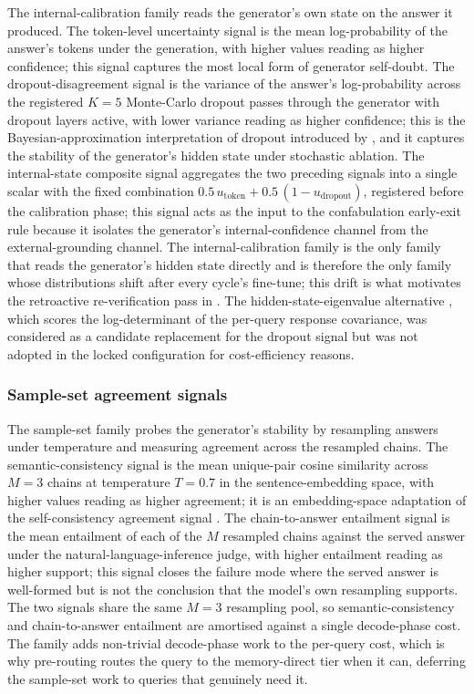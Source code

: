 The internal-calibration family reads the generator's own state on the answer it produced. The token-level uncertainty signal is the mean log-probability of the answer's tokens under the generation, with higher values reading as higher confidence; this signal captures the most local form of generator self-doubt. The dropout-disagreement signal is the variance of the answer's log-probability across the registered $K=5$ Monte-Carlo dropout passes through the generator with dropout layers active, with lower variance reading as higher confidence; this is the Bayesian-approximation interpretation of dropout introduced by \cite{pmlr-v48-gal16}, and it captures the stability of the generator's hidden state under stochastic ablation. The internal-state composite signal aggregates the two preceding signals into a single scalar with the fixed combination $0.5\,u_{\text{token}} + 0.5\,(1-u_{\text{dropout}})$, registered before the calibration phase; this signal acts as the input to the confabulation early-exit rule because it isolates the generator's internal-confidence channel from the external-grounding channel. The internal-calibration family is the only family that reads the generator's hidden state directly and is therefore the only family whose distributions shift after every cycle's fine-tune; this drift is what motivates the retroactive re-verification pass in . The hidden-state-eigenvalue alternative \cite{chen2024inside}, which scores the log-determinant of the per-query response covariance, was considered as a candidate replacement for the dropout signal but was not adopted in the locked configuration for cost-efficiency reasons.

\subsubsection{Sample-set agreement signals}
\label{sec:verifier-sample-set}

The sample-set family probes the generator's stability by resampling answers under temperature and measuring agreement across the resampled chains. The semantic-consistency signal is the mean unique-pair cosine similarity across $M=3$ chains at temperature $T=0.7$ in the sentence-embedding space, with higher values reading as higher agreement; it is an embedding-space adaptation of the self-consistency agreement signal \cite{wang2023selfconsistency}. The chain-to-answer entailment signal is the mean entailment of each of the $M$ resampled chains against the served answer under the natural-language-inference judge, with higher entailment reading as higher support; this signal closes the failure mode where the served answer is well-formed but is not the conclusion that the model's own resampling supports. The two signals share the same $M=3$ resampling pool, so semantic-consistency and chain-to-answer entailment are amortised against a single decode-phase cost. The family adds non-trivial decode-phase work to the per-query cost, which is why pre-routing routes the query to the memory-direct tier when it can, deferring the sample-set work to queries that genuinely need it.

